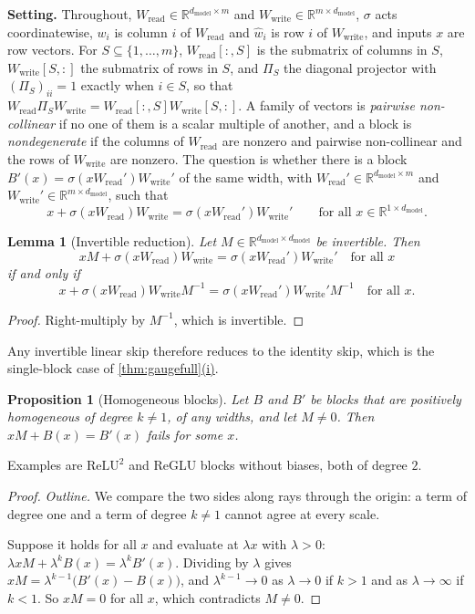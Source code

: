 \documentclass[10pt]{article}
\newtheorem{proposition}[theorem]{Proposition}
\newtheorem{lemma}[theorem]{Lemma}
\theoremstyle{definition}
\theoremstyle{remark}
\newcommand{\R}{\mathbb{R}}
\newcommand{\Wread}{W_{\mathrm{read}}}
\newcommand{\Wwrite}{W_{\mathrm{write}}}
\newcommand{\dm}{d_{\mathrm{model}}}
\newcommand{\para}[1]{\smallskip\noindent\textbf{#1}\hspace{0.5em}}
\DeclareRobustCommand{\cpref}[2]{\hyperref[#1:#2]{\cref*{#1}(#2)}}
\begin{document}
\para{Setting.} Throughout, $\Wread \in \R^{\dm \times m}$ and $\Wwrite \in \R^{m \times \dm}$, $\sigma$ acts coordinatewise, $w_i$ is column $i$ of $\Wread$ and $\hat w_i$ is row $i$ of $\Wwrite$, and inputs $x$ are row vectors. For $S \subseteq \{1, \dots, m\}$, $\Wread[{:},S]$ is the submatrix of columns in $S$, $\Wwrite[S,{:}]$ the submatrix of rows in $S$, and $\Pi_S$ the diagonal projector with $(\Pi_S)_{ii} = 1$ exactly when $i \in S$, so that $\Wread\Pi_S\Wwrite = \Wread[{:},S]\Wwrite[S,{:}]$. A family of vectors is \emph{pairwise non-collinear} if no one of them is a scalar multiple of another, and a block is \emph{nondegenerate} if the columns of $\Wread$ are nonzero and pairwise non-collinear and the rows of $\Wwrite$ are nonzero. The question is whether there is a block $B'(x) = \sigma(x\Wread')\Wwrite'$ of the same width, with $\Wread' \in \R^{\dm\times m}$ and $\Wwrite' \in \R^{m \times \dm}$, such that
\begin{equation}\label{eq:absorb}
x + \sigma(x\Wread)\Wwrite = \sigma(x\Wread')\Wwrite'\qquad\text{for all } x \in \R^{1\times\dm} .
\end{equation}

\begin{lemma}[Invertible reduction]\label{lem:f1}
Let $M \in \R^{\dm\times \dm}$ be invertible. Then
\[
xM + \sigma(x\Wread)\Wwrite = \sigma(x\Wread')\Wwrite'\quad\text{for all } x
\]
if and only if
\[
x + \sigma(x\Wread)\Wwrite M^{-1} = \sigma(x\Wread')\Wwrite' M^{-1}\quad\text{for all } x.
\]
\end{lemma}
\begin{proof}
Right-multiply by $M^{-1}$, which is invertible.
\end{proof}
Any invertible linear skip therefore reduces to the identity skip, which is the single-block case of \cpref{thm:gaugefull}{i}.

\begin{proposition}[Homogeneous blocks]\label{prop:f2}
Let $B$ and $B'$ be blocks that are positively homogeneous of degree $k \neq 1$, of any widths, and let $M \neq 0$. Then $xM + B(x) = B'(x)$ fails for some $x$.
\end{proposition}
Examples are $\mathrm{ReLU}^2$ and ReGLU blocks without biases, both of degree $2$.
\begin{proof}
\emph{Outline.} We compare the two sides along rays through the origin: a term of degree one and a term of degree $k \neq 1$ cannot agree at every scale.

Suppose it holds for all $x$ and evaluate at $\lambda x$ with $\lambda > 0$: $\lambda xM + \lambda^kB(x) = \lambda^kB'(x)$. Dividing by $\lambda$ gives $xM = \lambda^{k-1}\big(B'(x) - B(x)\big)$, and $\lambda^{k-1} \to 0$ as $\lambda \to 0$ if $k > 1$ and as $\lambda \to \infty$ if $k < 1$. So $xM = 0$ for all $x$, which contradicts $M \neq 0$.
\end{proof}
\end{document}
